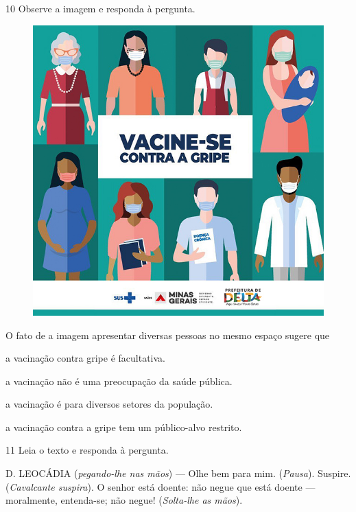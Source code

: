 \num{10} Observe a imagem e responda à pergunta.
 
\begin{figure}[htpb!]
\centering
\includegraphics[width=.7\textwidth]{./imgQ4PORT/media/image7.jpeg}
\end{figure}


O fato de a imagem apresentar diversas pessoas no mesmo espaço sugere
que

\begin{escolha}
  \item a vacinação contra gripe é facultativa.

  \item a vacinação não é uma preocupação da saúde pública.

  \item a vacinação é para diversos setores da população.

  \item a vacinação contra a gripe tem um público-alvo restrito.
\end{escolha}

\num{11} Leia o texto e responda à pergunta.

\begin{myquote}
D. LEOCÁDIA (\textit{pegando-lhe nas mãos}) --- Olhe bem para mim. 
(\textit{Pausa}). Suspire. (\textit{Cavalcante suspira}). O senhor está
doente: não negue que está doente --- moralmente, entenda-se; não negue!
(\textit{Solta-lhe as mãos}).

\end{myquote}

